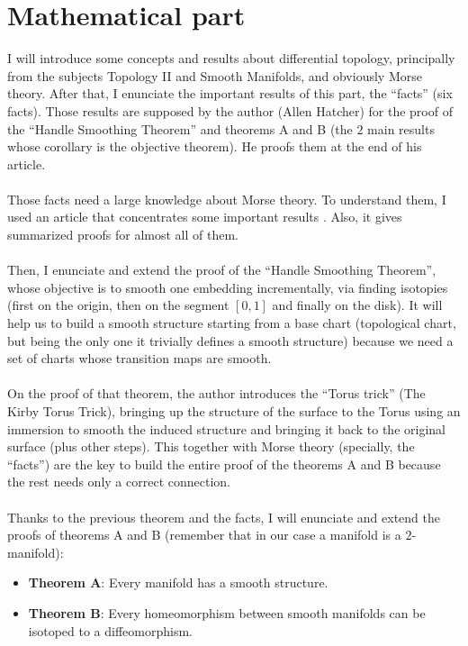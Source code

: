 \section*{Mathematical part}
I will introduce some concepts and results about differential topology, principally from the subjects Topology II and Smooth Manifolds, and obviously Morse theory. After that, I enunciate the important results of this part, the ``facts'' (six facts). Those results are supposed by the author (Allen Hatcher) for the proof of the ``Handle Smoothing Theorem'' and theorems A and B (the $2$ main results whose corollary is the objective theorem). He proofs them at the end of his article.\\
\\Those facts need a large knowledge about Morse theory. To understand them, I used an article that concentrates some important results \cite{MorseTh1}. Also, it gives summarized proofs for almost all of them.\\
\\Then, I enunciate and extend the proof of the ``Handle Smoothing Theorem'', whose objective is to smooth one embedding incrementally, via finding isotopies (first on the origin, then on the segment $[0,1]$ and finally on the disk). It will help us to build a smooth structure starting from a base chart (topological chart, but being the only one it trivially defines a smooth structure) because we need a set of charts whose transition maps are smooth.\\
\\On the proof of that theorem, the author introduces the ``Torus trick'' (The Kirby Torus Trick), bringing up the structure of the surface to the Torus using an immersion to smooth the induced structure and bringing it back to the original surface (plus other steps). This together with Morse theory (specially, the ``facts'') are the key to build the entire proof of the theorems A and B because the rest needs only a correct connection.\\
\\Thanks to the previous theorem and the facts, I will enunciate and extend the proofs of theorems A and B (remember that in our case a manifold is a $2$-manifold):
\begin{itemize}
	\item \textbf{Theorem A}: Every manifold has a smooth structure.
	\item \textbf{Theorem B}: Every homeomorphism between smooth manifolds can be isotoped to a diffeomorphism.
\end{itemize}
